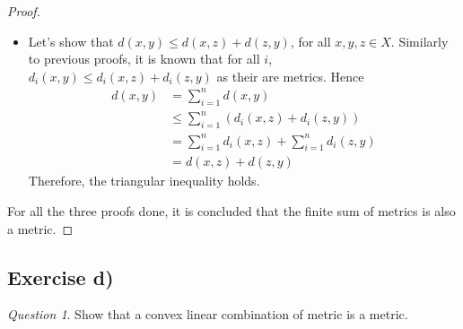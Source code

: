 \documentclass[11pt]{article}
\theoremstyle{definition}
\theoremstyle{remark}
\theoremstyle{remark}
\theoremstyle{remark}
\newtheorem*{question}{Question}
\begin{document}
\begin{proof}
\begin{itemize}
    \item Let's show that $d(x,y) \le d(x, z) + d(z, y)$, for all
      $x, y, z \in X$. Similarly to previous proofs, it is known that for all
      $i$, $d_{i}(x,y) \le d_{i}(x,z) + d_{i}(z, y)$ as their are metrics. Hence
      \begin{align*}
        d(x,y) &= \sum_{i=1}^{n}d(x,y) \\
               &\le \sum_{i=1}^{n}\left(d_{i}(x,z) + d_{i}(z, y)\right) \\
               &= \sum_{i=1}^{n} d_{i}(x,z) + \sum_{i=1}^{n}d_{i}(z,y) \\
               &= d(x, z) + d(z, y)
      \end{align*}
      Therefore, the triangular inequality holds.
  \end{itemize}

  For all the three proofs done, it is concluded that the finite sum of metrics
  is also a metric.
\end{proof}

\subsection*{Exercise d)}
\begin{question}
  Show that a convex linear combination of metric is a metric.
\end{question}
\end{document}
